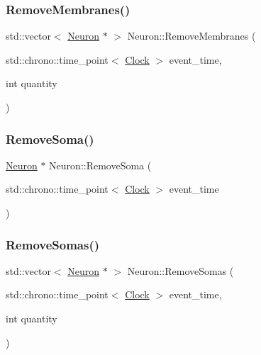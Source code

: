 \mbox{\label{classNeuron_a3cd5fc6f1a354d99bb8768df7ee40552}} 
\subsubsection{\texorpdfstring{Remove\+Membranes()}{RemoveMembranes()}}
{\footnotesize\ttfamily std\+::vector$<$ \mbox{\hyperlink{classNeuron}{Neuron}} $\ast$ $>$ Neuron\+::\+Remove\+Membranes (\begin{DoxyParamCaption}\item[{std\+::chrono\+::time\+\_\+point$<$ \mbox{\hyperlink{universe_8h_a0ef8d951d1ca5ab3cfaf7ab4c7a6fd80}{Clock}} $>$}]{event\+\_\+time,  }\item[{int}]{quantity }\end{DoxyParamCaption})}

\mbox{\label{classNeuron_a4f8c2f0c1b294493a7c581a7f46c2863}} 
\subsubsection{\texorpdfstring{Remove\+Soma()}{RemoveSoma()}}
{\footnotesize\ttfamily \mbox{\hyperlink{classNeuron}{Neuron}} $\ast$ Neuron\+::\+Remove\+Soma (\begin{DoxyParamCaption}\item[{std\+::chrono\+::time\+\_\+point$<$ \mbox{\hyperlink{universe_8h_a0ef8d951d1ca5ab3cfaf7ab4c7a6fd80}{Clock}} $>$}]{event\+\_\+time }\end{DoxyParamCaption})}

\mbox{\label{classNeuron_a976b1bab63d0bd21b1c8c8e1cfbd17fe}} 
\subsubsection{\texorpdfstring{Remove\+Somas()}{RemoveSomas()}}
{\footnotesize\ttfamily std\+::vector$<$ \mbox{\hyperlink{classNeuron}{Neuron}} $\ast$ $>$ Neuron\+::\+Remove\+Somas (\begin{DoxyParamCaption}\item[{std\+::chrono\+::time\+\_\+point$<$ \mbox{\hyperlink{universe_8h_a0ef8d951d1ca5ab3cfaf7ab4c7a6fd80}{Clock}} $>$}]{event\+\_\+time,  }\item[{int}]{quantity }\end{DoxyParamCaption})}

